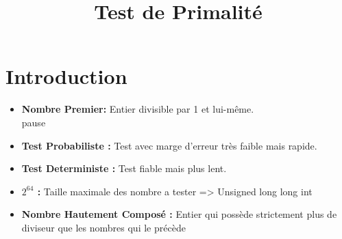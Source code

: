 
\usepackage{../tex/myInfolines}
\usepackage{longtable,array}
\title{Test de Primalité}


	\begin{frame}
		\titlepage
	\end{frame}
	
	\section*{Introduction}
        \begin{frame}
            \begin{itemize}
            \item \textbf{Nombre Premier:} Entier divisible par 1 et lui-même.\\pause
            \vspace{1em}            
            \item \textbf{Test Probabiliste :} Test avec marge d'erreur très faible mais rapide.  \\
            \vspace{1em}
            \item \textbf{ Test Deterministe :} Test fiable mais plus lent.    \\
            \vspace{1em}
            \item \textbf{$2^{64}$ :} Taille maximale des nombre a tester => Unsigned long long int  \\
            \vspace{1em}
            \item \textbf{Nombre Hautement Composé :} Entier qui possède strictement plus de diviseur que les nombres qui le précède\\
            \end{itemize}            
        \end{frame}
	
	\begin{frame}
		\tableofcontents
	\end{frame}
	
